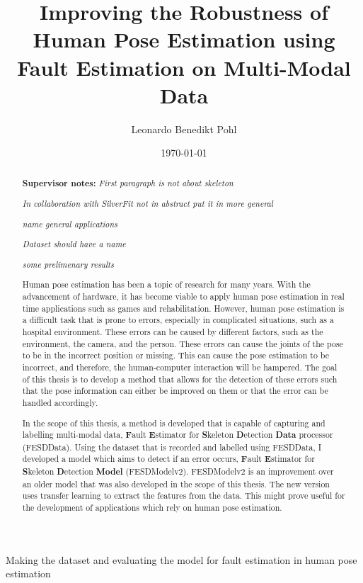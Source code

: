 
\title{Improving the Robustness of Human Pose Estimation using Fault Estimation on Multi-Modal Data}
\author{Leonardo Benedikt Pohl}
Making the dataset and evaluating the model for fault estimation in human pose estimation

\date{\today}


% 


\clearpage

\begin{abstract}
    \textbf{Supervisor notes:}      
      \textit{   First paragraph is not about skeleton}
      
      \textit{    In collaboration with SilverFit not in abstract put it in more general}
      
      \textit{      name general applications}
      
      \textit{      Dataset should have a name}
      
      \textit{       some prelimenary results}
  
  Human pose estimation has been a topic of research for many years. With the advancement of hardware, it has become viable to apply human pose estimation in real time applications such as games and rehabilitation. However, human pose estimation is a difficult task that is prone to errors, especially in complicated situations, such as a hospital environment. These errors can be caused by different factors, such as the environment, the camera, and the person. These errors can cause the joints of the pose to be in the incorrect position or missing. This can cause the pose estimation to be incorrect, and therefore, the human-computer interaction will be hampered. The goal of this thesis is to develop a method that allows for the detection of these errors such that the pose information can either be improved on them or that the error can be handled accordingly.

  In the scope of this thesis, a method is developed that is capable of capturing and labelling multi-modal data, \textbf{F}ault \textbf{E}stimator for \textbf{S}keleton \textbf{D}etection \textbf{Data} processor (FESDData). Using the dataset that is recorded and labelled using FESDData, I developed a model which aims to detect if an error occurs, \textbf{F}ault \textbf{E}stimator for \textbf{S}keleton \textbf{D}etection \textbf{Model} (FESDModelv2). FESDModelv2 is an improvement over an older model that was also developed in the scope of this thesis. The new version uses transfer learning to extract the features from the data. This might prove useful for the development of applications which rely on human pose estimation.


\end{abstract}
